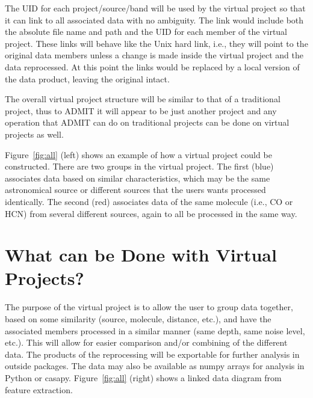 \documentclass[11pt,twoside]{article}
\begin{document}
The UID for each project/source/band will be used by the virtual project so that it can link to all associated data with no ambiguity. The link would include both the absolute file name and path and the UID for each member of the virtual project. These links will behave like the Unix hard link, i.e., they will point to the original data members unless a change is made inside the virtual project and the data reprocessed. At this point the links would be replaced by a local version of the data product, leaving the original intact.

The overall virtual project structure will be similar to that of a traditional project, thus to ADMIT it will appear to be just another project and any operation that ADMIT can do on traditional projects can be done on virtual projects as well.

Figure~\ref{fig:all} (left) shows an example of how a virtual project could be constructed. There are two groups in the virtual project. The first (blue) associates data based on similar characteristics, which
may be the same astronomical source or different sources that the users wants processed identically. The second (red) associates data of the same molecule (i.e., CO or HCN) from several different sources, again to all be processed in the same way.


\section{What can be Done with Virtual Projects?}
The purpose of the virtual project is to allow the user to group data together, based on some similarity (source, molecule, distance, etc.), and have the associated members processed in a similar manner (same depth, same noise level, etc.). This will allow for easier comparison and/or combining of the different data. The products of the reprocessing will be exportable for further analysis in outside packages. The data may also be available as numpy arrays for analysis in Python or casapy. Figure~\ref{fig:all} (right) shows a linked data diagram from feature extraction.
\end{document}
